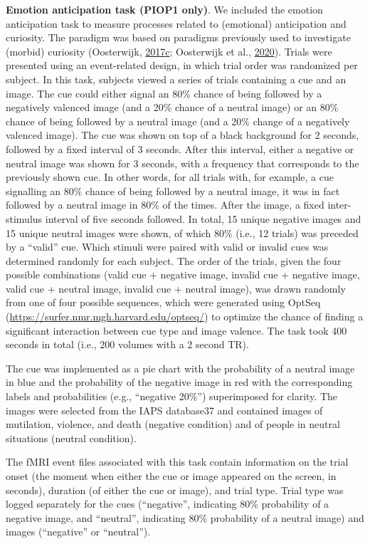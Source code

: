 \documentclass[11pt,american,]{memoir} %
\begin{document}
\textbf{Emotion anticipation task (PIOP1 only)}. We included the emotion anticipation task to measure processes related to (emotional) anticipation and curiosity. The paradigm was based on paradigms previously used to investigate (morbid) curiosity (Oosterwijk, \protect\hyperlink{ref-Oosterwijk2017-dw}{2017}\protect\hyperlink{ref-Oosterwijk2017-dw}{c}; Oosterwijk et al., \protect\hyperlink{ref-Oosterwijk2020-uf}{2020}). Trials were presented using an event-related design, in which trial order was randomized per subject. In this task, subjects viewed a series of trials containing a cue and an image. The cue could either signal an 80\% chance of being followed by a negatively valenced image (and a 20\% chance of a neutral image) or an 80\% chance of being followed by a neutral image (and a 20\% change of a negatively valenced image). The cue was shown on top of a black background for 2 seconds, followed by a fixed interval of 3 seconds. After this interval, either a negative or neutral image was shown for 3 seconds, with a frequency that corresponds to the previously shown cue. In other words, for all trials with, for example, a cue signalling an 80\% chance of being followed by a neutral image, it was in fact followed by a neutral image in 80\% of the times. After the image, a fixed inter-stimulus interval of five seconds followed. In total, 15 unique negative images and 15 unique neutral images were shown, of which 80\% (i.e., 12 trials) was preceded by a ``valid'' cue. Which stimuli were paired with valid or invalid cues was determined randomly for each subject. The order of the trials, given the four possible combinations (valid cue + negative image, invalid cue + negative image, valid cue + neutral image, invalid cue + neutral image), was drawn randomly from one of four possible sequences, which were generated using OptSeq (\url{https://surfer.nmr.mgh.harvard.edu/optseq/}) to optimize the chance of finding a significant interaction between cue type and image valence. The task took 400 seconds in total (i.e., 200 volumes with a 2 second TR).

The cue was implemented as a pie chart with the probability of a neutral image in blue and the probability of the negative image in red with the corresponding labels and probabilities (e.g., ``negative 20\%'') superimposed for clarity. The images were selected from the IAPS database37 and contained images of mutilation, violence, and death (negative condition) and of people in neutral situations (neutral condition).

The fMRI event files associated with this task contain information on the trial onset (the moment when either the cue or image appeared on the screen, in seconds), duration (of either the cue or image), and trial type. Trial type was logged separately for the cues (``negative'', indicating 80\% probability of a negative image, and ``neutral'', indicating 80\% probability of a neutral image) and images (``negative'' or ``neutral'').
\end{document}
